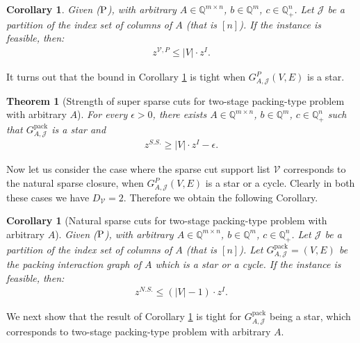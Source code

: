 \documentclass[smallextended]{svjour3}
\newtheorem{theorem}[proposition]{Theorem}
\newtheorem{corollary}[proposition]{Corollary}
\begin{document}
\begin{corollary}\label{cor:supersparseSS}
Given ($\textup{P}$), with arbitrary $A \in \mathbb{Q}^{m \times n}$, $b \in \mathbb{Q}^m$, $c\in \mathbb{Q}^n_{+}$. Let $\mathcal{J}$ be a partition of the index set of columns of $A$ (that is $[n]$). If the instance is feasible, then:
\begin{eqnarray*}
z^{\mathcal{V}, P} \leq |V| \cdot z^I.
\end{eqnarray*}
\end{corollary}

It turns out that the bound in Corollary \ref{cor:supersparseSS} is tight when $G^P_{A,\mathcal{J}}(V, E)$ is a star.

\begin{theorem}[Strength of super sparse cuts for two-stage packing-type problem with arbitrary  $A$]\label{thm:SSarbitAstartight}
For every $\epsilon >0$, there exists $A \in \mathbb{Q}^{m \times n}$, $b \in \mathbb{Q}^m$, $c\in \mathbb{Q}^n_{+}$ such that ${G^{\textrm{pack}}_{A, {\mathcal{J}}}}$ is a star and
\begin{eqnarray*}
z^{S.S.} \geq |V| \cdot z^I -\epsilon.
\end{eqnarray*} 
\end{theorem}

Now let us consider the case where the sparse cut support list ${\mathcal{V}}$ corresponds to the natural sparse closure, when $G^P_{A,\mathcal{J}}(V, E)$ is a star or a cycle.
Clearly in both these cases we have $D_{\mathcal{V}} = 2$. Therefore we obtain the following Corollary.

\begin{corollary}[Natural sparse cuts for two-stage packing-type problem with arbitrary $A$]\label{cor:nsparseSS}
Given ($\textup{P}$), with arbitrary $A \in \mathbb{Q}^{m \times n}$, $b \in \mathbb{Q}^m$, $c\in \mathbb{Q}^n_{+}$. Let $\mathcal{J}$ be a partition of the index set of columns of $A$ (that is $[n]$). Let ${G^{\textrm{pack}}_{A, {\mathcal{J}}}} = (V,E)$ be the packing interaction graph of $A$ which is a star or a cycle. If the instance is feasible, then:
\begin{eqnarray*}
z^{N.S.} \leq (|V| - 1) \cdot z^I.
\end{eqnarray*}
\end{corollary}

We next show that the result of Corollary \ref{cor:nsparseSS} is tight for ${G^{\textrm{pack}}_{A, {\mathcal{J}}}}$ being a star, which corresponds to two-stage packing-type problem with arbitrary $A$.
\end{document}
